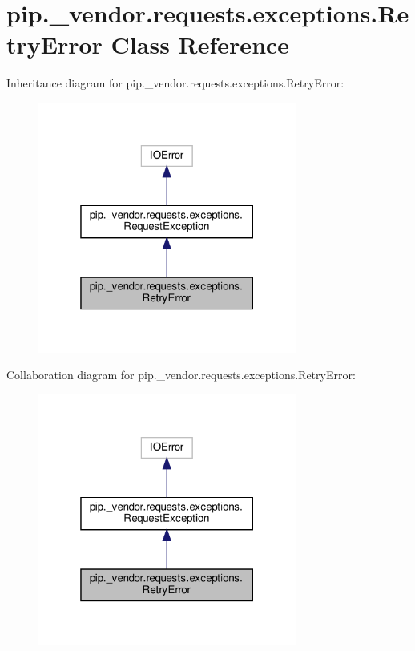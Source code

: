 \hypertarget{classpip_1_1__vendor_1_1requests_1_1exceptions_1_1RetryError}{}\section{pip.\+\_\+vendor.\+requests.\+exceptions.\+Retry\+Error Class Reference}
\label{classpip_1_1__vendor_1_1requests_1_1exceptions_1_1RetryError}


Inheritance diagram for pip.\+\_\+vendor.\+requests.\+exceptions.\+Retry\+Error\+:
\nopagebreak
\begin{figure}[H]
\begin{center}
\leavevmode
\includegraphics[width=241pt]{classpip_1_1__vendor_1_1requests_1_1exceptions_1_1RetryError__inherit__graph}
\end{center}
\end{figure}


Collaboration diagram for pip.\+\_\+vendor.\+requests.\+exceptions.\+Retry\+Error\+:
\nopagebreak
\begin{figure}[H]
\begin{center}
\leavevmode
\includegraphics[width=241pt]{classpip_1_1__vendor_1_1requests_1_1exceptions_1_1RetryError__coll__graph}
\end{center}
\end{figure}
